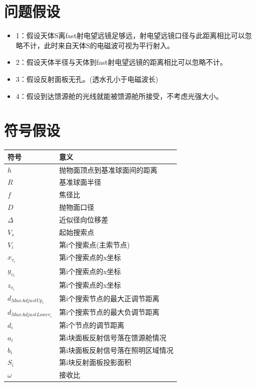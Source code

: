 \documentclass[withoutpreface,bwprint]{cumcmthesis} %
\begin{document}
        \section{问题假设}
        \begin{itemize}
            \item  1：假设天体S离fast射电望远镜足够远，射电望远镜口径与此距离相比可以忽略不计，此时来自天体S的电磁波可视为平行射入。
            \item  2：假设天体半径与天体到fast射电望远镜的距离相比可以忽略不计。 
            \item  3：假设反射面板无孔。(透水孔小于电磁波长)
            \item  4：假设到达馈源舱的光线就能被馈源舱所接受，不考虑光强大小。
        \end{itemize}
        

        
        \section{符号假设}

        \begin{longtable}{p{8cm}<{\centering}p{7.5cm}}
            \toprule  %
            符号& 意义\\
            \midrule  %
            $h$ & 抛物面顶点到基准球面间的距离  \\
            $R$  & 基准球面半径\\
            $f$   &焦径比\\
            $D$   &抛物面口径\\
            $\Delta$ & 近似径向位移差\\
            $V_s$ & 起始搜索点\\
            $V_i$ &第i个搜索点(主索节点)\\
            $x_{v_i}$ &第i个搜索点的x坐标\\
            $y_{v_i}$ &第i个搜索点的x坐标\\
            $z_{v_i}$ &第i个搜索点的x坐标\\
            $d_{MaxAdjustUp_i}$&第i个搜索节点的最大正调节距离\\
            $d_{MaxAdjustLower_i}$&第i个搜索节点的最大负调节距离\\
            $d_i$ &第i个节点的调节距离 \\
            $a_i$ & 第i块面板反射信号落在馈源舱情况\\
            $b_i$ & 第i块面板反射信号落在照明区域情况\\
            $S_i$ & 第i块反射面板投影面积\\
            $\omega$ & 接收比\\
            \bottomrule %
        \end{longtable}
\end{document}
